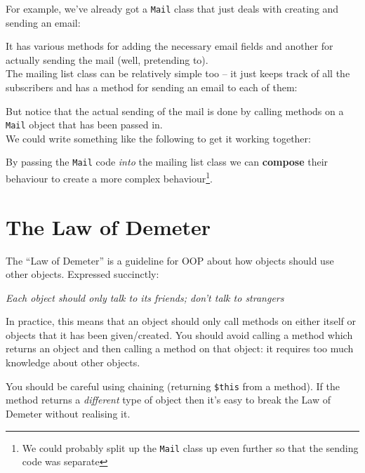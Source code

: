 For example, we've already got a \texttt{Mail} class that just deals with creating and sending an email:


It has various methods for adding the necessary email fields and another for actually sending the mail (well, pretending to).
\\

The mailing list class can be relatively simple too – it just keeps track of all the subscribers and has a method for sending an email to each of them:


But notice that the actual sending of the mail is done by calling methods on a \texttt{Mail} object that has been passed in.
\\

We could write something like the following to get it working together:


By passing the \texttt{Mail} code \textit{into} the mailing list class we can \textbf{compose} their behaviour to create a more complex behaviour\footnote{We could probably split up the \texttt{Mail} class up even further so that the sending code was separate}.


\section{The Law of Demeter}

The ``Law of Demeter'' is a guideline for OOP about how objects should use other objects. Expressed succinctly:
\\

\begin{center}
    \textit{Each object should only talk to its friends; don't talk to strangers}
\end{center}
\par\bigskip


In practice, this means that an object should only call methods on either itself or objects that it has been given/created. You should avoid calling a method which returns an object and then calling a method on that object: it requires too much knowledge about other objects.


You should be careful using chaining (returning \texttt{\$this} from a method). If the method returns a \textit{different} type of object then it's easy to break the Law of Demeter without realising it.



